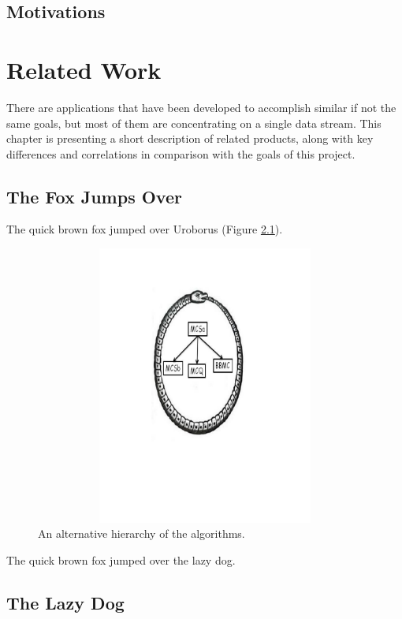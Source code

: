 \documentclass{l4proj}
\begin{document}
\section{Motivations}

\chapter{Related Work}
There are applications that have been developed to accomplish similar if not the same goals, but most of them are concentrating on a single data stream. This chapter is presenting a short description of related products, along with key differences and correlations in comparison with the goals of this project.   

\section{The Fox Jumps Over}

The quick brown fox jumped over Uroborus (Figure \ref{uroborus}).


\begin{figure}
\centering
\includegraphics[height=9.2cm,width=13.2cm]{uroboros.pdf}
\vspace{-30mm}
\caption{An alternative hierarchy of the algorithms.}
\label{uroborus}
\end{figure}


The quick brown fox jumped over \cite{ckt} the lazy dog.


\section{The Lazy Dog}
\end{document}
